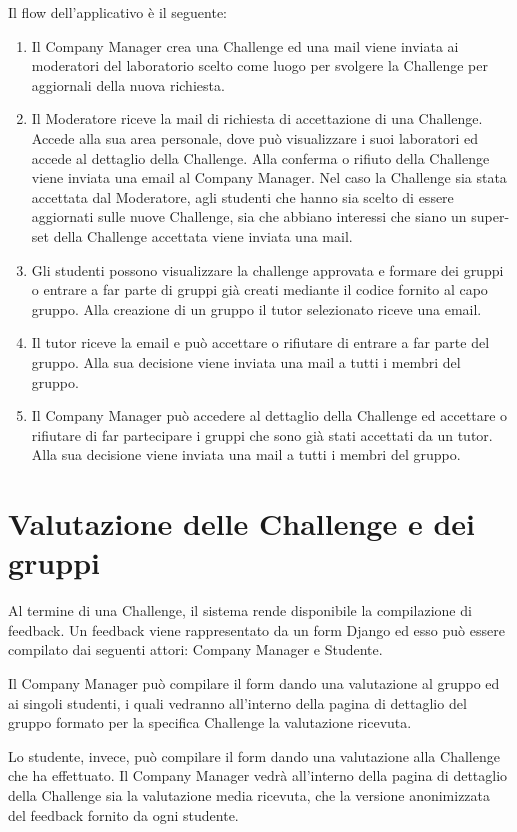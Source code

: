 Il flow dell'applicativo è il seguente:
\begin{enumerate}
    \item Il Company Manager crea una Challenge ed una mail viene inviata ai moderatori del laboratorio scelto come luogo per svolgere la Challenge per aggiornali della nuova richiesta.
    \item Il Moderatore riceve la mail di richiesta di accettazione di una Challenge. Accede alla sua area personale, dove può visualizzare i suoi laboratori ed accede al dettaglio della Challenge. Alla conferma o rifiuto della Challenge viene inviata una email al Company Manager. Nel caso la Challenge sia stata accettata dal Moderatore, agli studenti che hanno sia scelto di essere aggiornati sulle nuove Challenge, sia che abbiano interessi che siano un super-set della Challenge accettata viene inviata una mail.
    \item Gli studenti possono visualizzare la challenge approvata e formare dei gruppi o entrare a far parte di gruppi già creati mediante il codice fornito al capo gruppo. Alla creazione di un gruppo il tutor selezionato riceve una email.
    \item Il tutor riceve la email e può accettare o rifiutare di entrare a far parte del gruppo. Alla sua decisione viene inviata una mail a tutti i membri del gruppo.
    \item Il Company Manager può accedere al dettaglio della Challenge ed accettare o rifiutare di far partecipare i gruppi che sono già stati accettati da un tutor. Alla sua decisione viene inviata una mail a tutti i membri del gruppo.
\end{enumerate}


\section{Valutazione delle Challenge e dei gruppi}
\label{sec:valutazioni}

Al termine di una Challenge, il sistema rende disponibile la compilazione di feedback. Un feedback viene rappresentato da un form Django ed esso può essere compilato dai seguenti attori: Company Manager e Studente. 

Il Company Manager può compilare il form dando una valutazione al gruppo ed ai singoli studenti, i quali vedranno all'interno della pagina di dettaglio del gruppo formato per la specifica Challenge la valutazione ricevuta.

Lo studente, invece, può compilare il form dando una valutazione alla Challenge che ha effettuato. Il Company Manager vedrà all'interno della pagina di dettaglio della Challenge sia la valutazione media ricevuta, che la versione anonimizzata del feedback fornito da ogni studente. 


